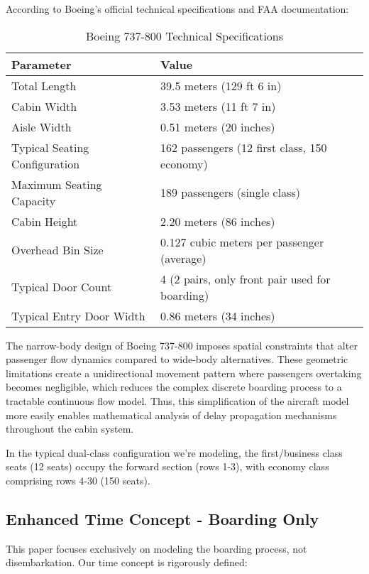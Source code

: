 \documentclass[12pt]{article}
\begin{document}
According to Boeing's official technical specifications and FAA documentation:

\begin{table}[H]
\centering
\caption{Boeing 737-800 Technical Specifications}
\begin{tabular}{ll}
\hline
\textbf{Parameter} & \textbf{Value} \\
\hline
Total Length & 39.5 meters (129 ft 6 in) \\
Cabin Width & 3.53 meters (11 ft 7 in) \\
Aisle Width & 0.51 meters (20 inches) \\
Typical Seating Configuration & 162 passengers (12 first class, 150 economy) \\
Maximum Seating Capacity & 189 passengers (single class) \\
Cabin Height & 2.20 meters (86 inches) \\
Overhead Bin Size & 0.127 cubic meters per passenger (average) \\
Typical Door Count & 4 (2 pairs, only front pair used for boarding) \\
Typical Entry Door Width & 0.86 meters (34 inches) \\
\hline
\end{tabular}
\end{table}

The narrow-body design of Boeing 737-800 imposes spatial constraints that alter passenger flow dynamics compared to wide-body alternatives. These geometric limitations create a unidirectional movement pattern where passengers overtaking becomes negligible, which reduces the complex discrete boarding process to a tractable continuous flow model. Thus, this simplification of the aircraft model more easily enables mathematical analysis of delay propagation mechanisms throughout the cabin system.

In the typical dual-class configuration we're modeling, the first/business class seats (12 seats) occupy the forward section (rows 1-3), with economy class comprising rows 4-30 (150 seats).

\subsection{Enhanced Time Concept - Boarding Only}

This paper focuses exclusively on modeling the boarding process, not disembarkation. Our time concept is rigorously defined:
\end{document}
